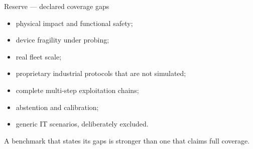 \documentclass[aspectratio=169,10pt]{beamer}
\begin{document}
\begin{frame}{Reserve --- declared coverage gaps}
  \small
  \begin{itemize}
    \item physical impact and functional safety;
    \item device fragility under probing;
    \item real fleet scale;
    \item proprietary industrial protocols that are not simulated;
    \item complete multi-step exploitation chains;
    \item abstention and calibration;
    \item generic IT scenarios, deliberately excluded.
  \end{itemize}

  \vspace{0.8em}
  A benchmark that states its gaps is stronger than one that claims full
  coverage.
\end{frame}
\end{document}
